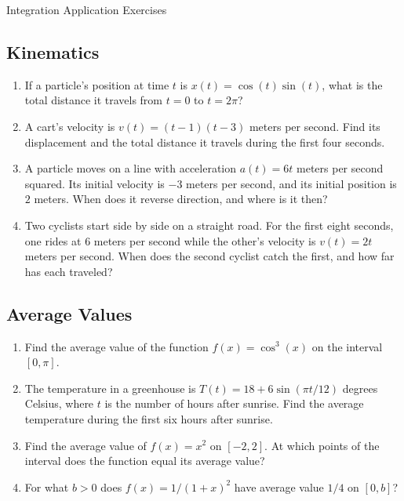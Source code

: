 \documentclass{article}
\begin{document}
\begin{center}
\begin{Huge}Integration Application Exercises\end{Huge}
\end{center}


\subsection{Kinematics}
\begin{enumerate}
\item If a particle's position at time $t$ is $x(t)=\cos(t)\sin(t)$, what is the total distance it travels from $t=0$ to $t=2\pi$?
\item A cart's velocity is $v(t)=(t-1)(t-3)$ meters per second. Find its displacement and the total distance it travels during the first four seconds.
\item A particle moves on a line with acceleration $a(t)=6t$ meters per second squared. Its initial velocity is $-3$ meters per second, and its initial position is $2$ meters. When does it reverse direction, and where is it then?
\item Two cyclists start side by side on a straight road. For the first eight seconds, one rides at $6$ meters per second while the other's velocity is $v(t)=2t$ meters per second. When does the second cyclist catch the first, and how far has each traveled?
\end{enumerate}


\subsection{Average Values}
\begin{enumerate}
\item Find the average value of the function $f(x) = \cos^3(x)$ on the interval $[0,\pi]$.
\item The temperature in a greenhouse is $T(t)=18+6\sin(\pi t/12)$ degrees Celsius, where $t$ is the number of hours after sunrise. Find the average temperature during the first six hours after sunrise.
\item Find the average value of $f(x)=x^2$ on $[-2,2]$. At which points of the interval does the function equal its average value?
\item For what $b>0$ does $f(x)=1/(1+x)^2$ have average value $1/4$ on $[0,b]$?

\end{enumerate}
\end{document}
